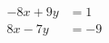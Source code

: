 \documentclass[border=5pt]{standalone}
\begin{document}
$\begin{aligned}
-8x+9y&=1\\8x-7y&=-9
\end{aligned}$
\end{document}
